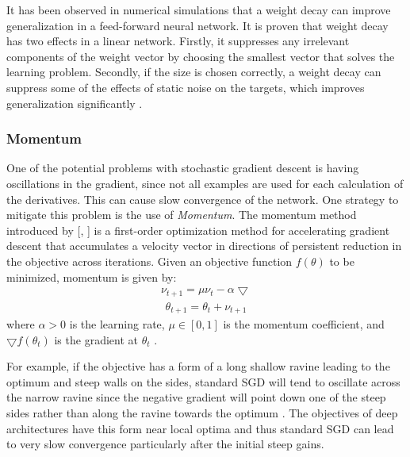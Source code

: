  It has been observed in numerical simulations that a weight decay can improve generalization in a feed-forward neural network. It is proven that weight decay has two effects in a linear network. Firstly, it suppresses any irrelevant components of the weight vector by choosing the smallest vector that solves the learning problem. Secondly, if the size is chosen correctly, a weight decay can suppress some of the effects of static noise on the targets, which improves generalization significantly \cite{moody1995simple}. 

\subsubsection{Momentum}
One of the potential problems with stochastic gradient descent is having oscillations in the gradient, since not all examples are used for each calculation of the derivatives. This can cause slow convergence of the network. One strategy to mitigate this problem is the use of \textit{Momentum}. The momentum method introduced by [\citeauthor{polyak1964some}, \citeyear{polyak1964some}] is a first-order optimization method for accelerating gradient descent that accumulates a velocity vector in directions of persistent reduction in the objective across iterations. Given an objective function $f(\theta)$ to be minimized, momentum is given by:
\begin{equation}
	\label{eq:t}
	\begin{aligned}
		\nu_{t+1} = \mu\nu_t - \alpha\bigtriangledown 
	\end{aligned}
\end{equation}
\begin{equation}
	\label{eq:t}
	\begin{gathered}
	\theta_{t+1} = \theta_t + \nu_{t + 1}
	\end{gathered}
\end{equation}
where $\alpha > 0$ is the learning rate, $\mu \in [0,1]$ is the momentum coefficient, and $\bigtriangledown f(\theta_t)$ is the gradient at $\theta_t$ \cite{sutskever2013importance}. 

For example, if the objective has a form of a long shallow ravine leading to the optimum and steep walls on the sides, standard SGD will tend to oscillate across the narrow ravine since the negative gradient will point down one of the steep sides rather than along the ravine towards the optimum \cite{sgd}. The objectives of deep architectures have this form near local optima and thus standard SGD can lead to very slow convergence particularly after the initial steep gains. 

